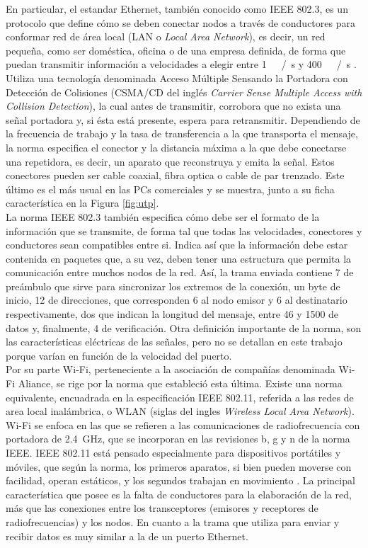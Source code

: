 En particular, el estandar Ethernet, también conocido como IEEE 802.3, es un protocolo que define cómo se deben conectar nodos a través de conductores para conformar red de área local (LAN o {\it Local Area Network}), es decir, un red pequeña, como ser doméstica, oficina o de una empresa definida, de forma que puedan transmitir información a velocidades a elegir entre \SI{1}{\mega\bit\slash\second} y \SI{400}{\giga\bit\slash\second} \cite{Ethernet2018}. Utiliza una tecnología denominada Acceso Múltiple Sensando la Portadora con Detección de Colisiones (CSMA/CD del inglés {\it Carrier Sense Multiple Access with Collision Detection}), la cual antes de transmitir, corrobora que no exista una señal portadora y, si ésta está presente, espera para retransmitir. Dependiendo de la frecuencia de trabajo y la tasa de transferencia a la que transporta el mensaje, la norma especifica el conector y la distancia máxima a la que debe conectarse una repetidora, es decir, un aparato que reconstruya y emita la señal. Estos conectores pueden ser cable coaxial, fibra optica o cable de par trenzado. Este último es el más usual en las PCs comerciales y se muestra, junto a su ficha característica en la Figura \ref{fig:utp}.\\

La norma IEEE 802.3 también especifica cómo debe ser el formato de la información que se transmite, de forma tal que todas las velocidades, conectores y conductores sean compatibles entre si. Indica así que la información debe estar contenida en paquetes que, a su vez, deben tener una estructura que permita la comunicación entre muchos nodos de la red. Así, la trama enviada contiene \SI{7}{\byte} de preámbulo que sirve para sincronizar los extremos de la conexión, un byte de inicio, 12 de direcciones, que corresponden 6 al nodo emisor y 6 al destinatario respectivamente, dos que indican la longitud del mensaje, entre 46 y \SI{1500}{\byte} de datos y, finalmente, 4 de verificación. Otra definición importante de la norma, son las características eléctricas de las señales, pero no se detallan en este trabajo porque varían en función de la velocidad del puerto.\\

Por su parte Wi-Fi, perteneciente a la asociación de compañías denominada Wi-Fi Aliance, se rige por la norma que estableció esta última. Existe una norma equivalente, encuadrada en la especificación IEEE 802.11, referida a las redes de area local inalámbrica, o WLAN (siglas del ingles {\it Wireless Local Area Network}). Wi-Fi se enfoca en las que se refieren a las comunicaciones de radiofrecuencia con portadora de \SI{2,4}{\giga\hertz}, que se incorporan en las revisiones b, g y n de la norma IEEE. IEEE 802.11 está pensado especialmente para dispositivos portátiles y móviles, que según la norma, los primeros aparatos, si bien pueden moverse con facilidad, operan estáticos, y los segundos trabajan en movimiento \cite{wifi2016}. La principal característica que posee es la falta de conductores para la elaboración de la red, más que las conexiones entre los transceptores (emisores y receptores de radiofrecuencias) y los nodos. En cuanto a la trama que utiliza para enviar y recibir datos es muy similar a la de un puerto Ethernet.\\

